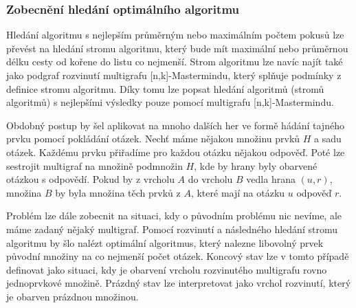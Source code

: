 \subsubsection{Zobecnění hledání optimálního algoritmu}
Hledání algoritmu s nejlepším průměrným nebo maximálním počtem pokusů lze převést na hledání stromu algoritmu, který bude mít maximální nebo průměrnou délku cesty od kořene do listu co nejmenší. Strom algoritmu lze navíc najít také jako podgraf rozvinutí multigrafu [n,k]-Mastermindu, který splňuje podmínky z definice stromu algoritmu. Díky tomu lze popsat hledání algoritmů (stromů algoritmů) s nejlepšími výsledky pouze pomocí multigrafu [n,k]-Mastermindu. 

Obdobný postup by šel aplikovat na mnoho dalších her ve formě hádání tajného prvku pomocí pokládání otázek. Nechť máme nějakou množinu prvků $H$ a sadu otázek. Každému prvku přiřadíme pro každou otázku nějakou odpověď. Poté lze sestrojit multigraf na množině podmnožin $H$, kde by hrany byly obarvené otázkou s odpovědí. Pokud by z vrcholu $A$ do vrcholu $B$ vedla hrana $(u,r)$, množina $B$ by byla množina těch prvků z $A$, které mají na otázku $u$ odpověď $r$. 

Problém lze dále zobecnit na situaci, kdy o původním problému nic nevíme, ale máme zadaný nějaký multigraf. Pomocí rozvinutí a následného hledání stromu algoritmu by šlo nalézt optimální algoritmus, který nalezne libovolný prvek původní množiny na co nejmenší počet otázek. Koncový stav lze v tomto případě definovat jako situaci, kdy je obarvení vrcholu rozvinutého multigrafu rovno jednoprvkové množině. Prázdný stav lze interpretovat jako vrchol rozvinutí, který je obarven prázdnou množinou. 




